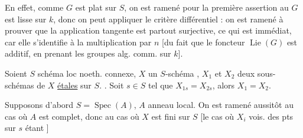 En effet, comme $G$ est plat sur $S$, on est ramené pour la première assertion au 
  $G$ est lisse sur $k$, donc on peut  appliquer le critère différentiel : on est ramené à prouver que la  application tangente est partout surjective, ce qui est immédiat, car elle s'identifie à la multiplication par $n$ [du fait que le foncteur $\operatorname{Lie}(G)$ est additif, en prenant les groupes alg. comm. sur $k$].

 Soient $S$ schéma  loc noeth. connexe, $X$ un  $S$-schéma , $X_1$ et $X_2$ deux sous-schémas  de $X$ \uline{étales}  sur $S$. . Soit $s\in S$ tel que $X_{1s}=X_{2s}$, alors $X_1=X_2$.


Supposons d'abord $S=\operatorname{Spec}(A)$, $A$ anneau local. On est ramené aussitôt au cas où $A$ est complet, donc  \deleted{et schémas \unsure{éloignés} de la fibre pt sur $s$]} au cas où $X$ est fini sur $S$ [le cas où $X_i$   vois. des pts sur $s$ étant ]
